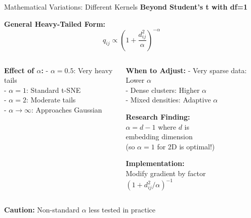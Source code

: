 \documentclass[10pt]{beamer}
\newcommand{\emphtext}[1]{\textcolor{upcblue}{\textbf{#1}}}
\newcommand{\warningbox}[1]{\colorbox{red!10}{\begin{minipage}{0.85\textwidth}\centering #1\end{minipage}}}
\begin{document}
\begin{frame}{Mathematical Variations: Different Kernels}
\emphtext{Beyond Student's t with df=1}

\vspace{0.3cm}
\textbf{General Heavy-Tailed Form:}
$$q_{ij} \propto \left(1 + \frac{d_{ij}^2}{\alpha}\right)^{-\alpha}$$

\vspace{0.3cm}
\begin{columns}[T]
\begin{column}{0.48\textwidth}
\textbf{Effect of $\alpha$:}
\footnotesize
- $\alpha = 0.5$: Very heavy tails\\
- $\alpha = 1$: Standard t-SNE\\
- $\alpha = 2$: Moderate tails\\
- $\alpha \to \infty$: Approaches Gaussian

\vspace{0.2cm}
\end{column}

\begin{column}{0.48\textwidth}
\textbf{When to Adjust:}
\footnotesize
- Very sparse data: Lower $\alpha$\\
- Dense clusters: Higher $\alpha$\\
- Mixed densities: Adaptive $\alpha$

\vspace{0.2cm}
\textbf{Research Finding:}\\
$\alpha = d-1$ where $d$ is\\
embedding dimension\\
(so $\alpha=1$ for 2D is optimal!)

\vspace{0.2cm}
\textbf{Implementation:}\\
Modify gradient by factor\\
$(1+d_{ij}^2/\alpha)^{-1}$
\end{column}
\end{columns}

\vspace{0.3cm}
\begin{center}
\warningbox{\footnotesize\textbf{Caution:} Non-standard $\alpha$ less tested in practice}
\end{center}
\end{frame}
\end{document}

